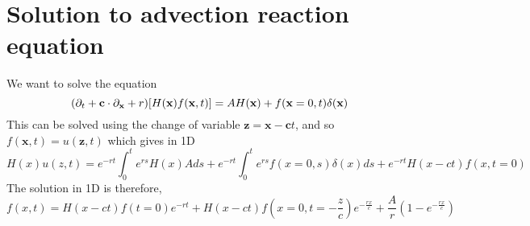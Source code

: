 \section{Solution to advection reaction equation}
\label{ap:kinetic_solved}

We want to solve the equation
\begin{equation}
    (\partial_t + \textbf{c}\cdot {\partial_\textbf{x}} + r)[H(\textbf{x}) f(\textbf{x},t)]= A H(\textbf{x}) + f(\textbf{x}=0,t)\delta(\textbf{x})
\end{equation}
This can be solved using the change of variable $\textbf{z}= \textbf{x}-\textbf{c}t$, and so $f(\textbf{x},t) = u(\textbf{z},t)$ which gives in 1D
\begin{equation}
H(x) u(z,t)
= 
e^{-rt}\int_0^t e^{rs} H(x) A ds
+ e^{-rt}\int_0^t e^{rs} f(x=0,s) \delta(x) ds
+ e^{-rt} H(x-ct) f(x,t=0)
\end{equation}
The solution in 1D is therefore,
\begin{equation}
    f(x,t) = H(x-ct) f(t=0) e^{-rt}
    + H(x-ct) f(x=0,t=-\frac{z}{c}) e^{-\frac{rx}{c}}+\frac{A}{r}(1-e^{-\frac{rx}{c}})
\end{equation}

